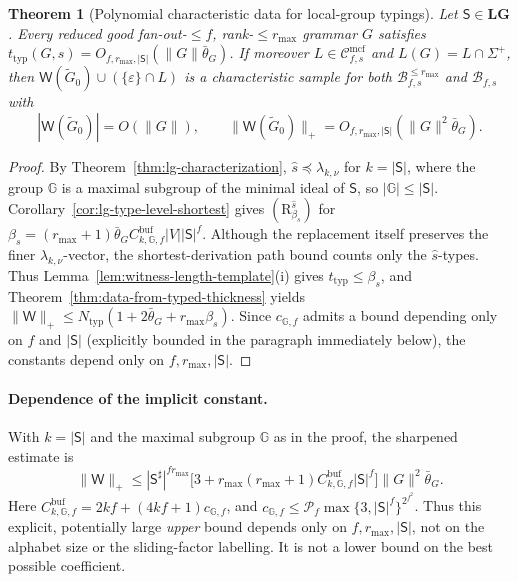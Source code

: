 \documentclass[11pt]{article}
\numberwithin{equation}{section}
\theoremstyle{plain}
\newtheorem{theorem}{Theorem}[section]
\theoremstyle{definition}
\theoremstyle{remark}
\newcommand{\Wit}{\mathsf{W}}
\newcommand{\Cmcf}[2]{\mathcal{C}^{\mathrm{mcf}}_{#1,#2}}
\newcommand{\eps}{\varepsilon}
\theoremstyle{plain}
\begin{document}
\begin{theorem}[Polynomial characteristic data for local-group typings]
\label{thm:local-group-polydata}
Let $\mathsf S\in\mathbf{LG}$.  Every reduced good fan-out-$\le f$,
rank-$\le r_{\max}$ grammar $G$ satisfies
$t_{\mathrm{typ}}(G,s)=O_{f,r_{\max},|\mathsf S|}(\|G\|\bar\theta_G)$.  If moreover
$L\in\Cmcf{f}{s}$ and $L(G)=L\cap\Sigma^+$, then
$\Wit(\widetilde G_0)\cup(\{\eps\}\cap L)$ is a characteristic sample for both
$\mathcal B^{\le r_{\max}}_{f,s}$ and $\mathcal B_{f,s}$ with
\[
 |\Wit(\widetilde G_0)|=O(\|G\|),\qquad
 \|\Wit(\widetilde G_0)\|_+=O_{f,r_{\max},|\mathsf S|}(\|G\|^2\bar\theta_G).
\]
\end{theorem}

\begin{proof}
By Theorem~\ref{thm:lg-characterization}, $\widehat s\preceq\lambda_{k,\nu}$
for $k=|\mathsf S|$, where the group $\mathbb G$ is a maximal subgroup of
the minimal ideal of $\mathsf S$, so $|{\mathbb G}|\le|\mathsf S|$.
Corollary~\ref{cor:lg-type-level-shortest} gives
$(\mathrm R_{\beta_s}^{\widehat s})$ for
$\beta_s=(r_{\max}+1)\bar\theta_G
C^{\mathrm{buf}}_{k,{\mathbb G},f}|V||\mathsf S|^f$.
Although the replacement itself preserves the finer $\lambda_{k,\nu}$-vector,
the shortest-derivation path bound counts only the $\widehat s$-types.
Thus Lemma~\ref{lem:witness-length-template}(i) gives
$t_{\mathrm{typ}}\le\beta_s$, and
Theorem~\ref{thm:data-from-typed-thickness} yields
$\|\Wit\|_+\le N_{\mathrm{typ}}(1+2\bar\theta_G+r_{\max}\beta_s)$.
Since $c_{{\mathbb G},f}$ admits a bound depending only on $f$ and
$|\mathsf S|$ (explicitly bounded in the paragraph immediately below),
the constants depend only on $f,r_{\max},|\mathsf S|$.
\end{proof}

\paragraph{Dependence of the implicit constant.}
With $k=|\mathsf S|$ and the maximal subgroup $\mathbb G$ as in the proof,
the sharpened estimate is
\[
 \|\Wit\|_+\le |\mathsf S^\sharp|^{fr_{\max}}
 \bigl[3+r_{\max}(r_{\max}+1)
 C^{\mathrm{buf}}_{k,{\mathbb G},f}|\mathsf S|^f\bigr]
 \|G\|^2\bar\theta_G.
\]
Here $C^{\mathrm{buf}}_{k,{\mathbb G},f}=
2kf+(4kf+1)c_{{\mathbb G},f}$, and
$c_{{\mathbb G},f}\le\mathcal P_f
\max\{3,|\mathsf S|^f\}^{2^{f^2}}$.
Thus this explicit, potentially large \emph{upper} bound depends only on
$f,r_{\max},|\mathsf S|$, not on the alphabet size or the sliding-factor
labelling.  It is not a lower bound on the best possible coefficient.
\end{document}
